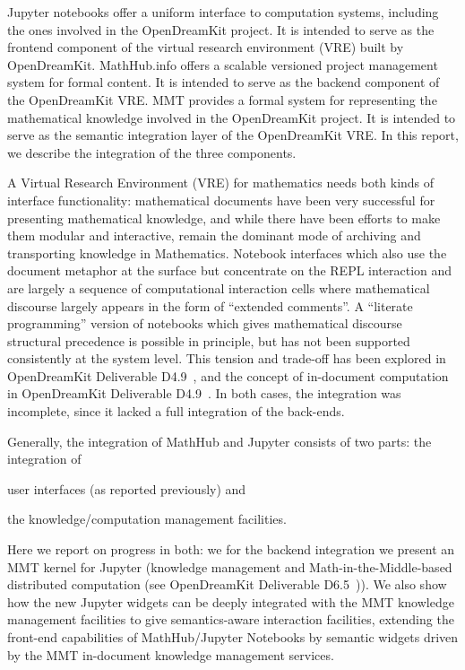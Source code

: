 Jupyter notebooks offer a uniform interface to computation systems, including the ones involved in the OpenDreamKit project.
It is intended to serve as the frontend component of the virtual research environment (VRE) built by OpenDreamKit.
MathHub.info offers a scalable versioned project management system for formal content.
It is intended to serve as the backend component of the OpenDreamKit VRE.
MMT provides a formal system for representing the mathematical knowledge involved in the OpenDreamKit project.
It is intended to serve as the semantic integration layer of the OpenDreamKit VRE.
In this report, we describe the integration of the three components.

A Virtual Research Environment (VRE) for mathematics needs both kinds of interface functionality: mathematical documents have been very successful for presenting mathematical knowledge, and while there have been efforts to make them modular and interactive, remain the dominant mode of archiving and transporting knowledge in Mathematics.
Notebook interfaces which also use the document metaphor at the surface but concentrate on the REPL interaction and are largely a sequence of computational interaction cells where mathematical discourse largely appears in the form of ``extended comments''.
A ``literate programming'' version of notebooks which gives mathematical discourse structural precedence is possible in principle, but has not been supported consistently at the system level.
This tension and trade-off has been explored in OpenDreamKit Deliverable D4.9~\cite{ODK-D4.2}, and the concept of in-document computation in OpenDreamKit Deliverable D4.9~\cite{ODK-D4.9}.
In both cases, the integration was incomplete, since it lacked a full integration of the back-ends. 

Generally, the integration of MathHub and Jupyter consists of two parts: the integration of
\begin{inparaenum}[\em a\rm )]
\item user interfaces (as reported previously) and
\item the knowledge/computation management facilities. 
\end{inparaenum}
Here we report on progress in both: we for the backend integration we present an MMT kernel for Jupyter (knowledge management and Math-in-the-Middle-based distributed computation (see OpenDreamKit Deliverable D6.5~\cite{ODK-D6.5})).
We also show how the new Jupyter widgets can be deeply integrated with the MMT knowledge management facilities to give semantics-aware interaction facilities, extending the front-end capabilities of MathHub/Jupyter Notebooks by semantic widgets driven by the MMT in-document knowledge management services.
 
